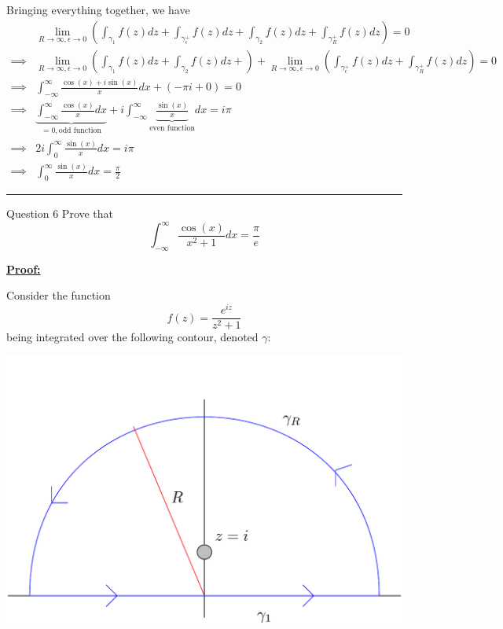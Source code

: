 \documentclass{article}
\begin{document}
\vskip 0.5cm
Bringing everything together, we have 
\begin{align*}
  & \lim_{R \rightarrow \infty, \epsilon \rightarrow 0} \left(\int_{{\gamma}_1} f(z) dz + \int_{{\gamma}_{\epsilon}^{+}} f(z) dz + \int_{{\gamma}_2} f(z) dz + \int_{{\gamma}_{R}^{+}} f(z) dz\right) = 0 \\
  \implies&  \lim_{R \rightarrow \infty, \epsilon \rightarrow 0} \left(\int_{{\gamma}_1} f(z) dz + \int_{{\gamma}_2} f(z) dz + \right) +  \lim_{R \rightarrow \infty, \epsilon \rightarrow 0} \left(\int_{{\gamma}_{\epsilon}^{+}} f(z) dz + \int_{{\gamma}_{R}^{+}} f(z) dz\right) = 0 \\
  \implies &\int_{-\infty}^{\infty} \frac{\cos(x) + i\sin(x)}{x} dx + \left(-\pi i + 0 \right) = 0 \\
  \implies & \underbrace{\int_{-\infty}^{\infty} \frac{\cos(x)}{x} dx }_{=0, \text{odd function}} + i\int_{-\infty}^{\infty} \underbrace{\frac{\sin(x)}{x}}_{\text{even function}} dx = i \pi \\
  \implies &2i\int_{0}^{\infty} \frac{\sin(x)}{x} dx = i \pi \\
  \implies & \boxed{ \int_{0}^{\infty} \frac{\sin(x)}{x} dx = \frac{\pi}{2} }
\end{align*}

\vskip 0.5cm
\hrule 
\vskip 0.5cm


\begin{mathdefinitionbox}{Question 6}
\vskip 0.5cm
Prove that 
\[ \int_{-\infty}^{\infty} \frac{\cos\left(x\right)}{x^2 + 1} dx = \frac{\pi}{e} \]
\end{mathdefinitionbox}

\vskip 0.5cm
\underline{\textbf{Proof:}}

Consider the function \[ f(z) = \frac{e^{iz}}{z^2 + 1} \] being integrated over the following contour, denoted $\gamma$:

\begin{center}
  \includegraphics*[scale=0.30]{Q6 HW 4.png}
\end{center}
\end{document}
